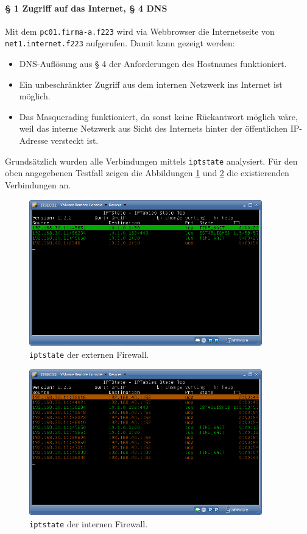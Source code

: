 \paragraph{§ 1 Zugriff auf das Internet, § 4 DNS}

Mit dem {\tt pc01.firma-a.f223} wird via Webbrowser die Internetseite
von {\tt net1.internet.f223} aufgerufen.
Damit kann gezeigt werden:
\begin{itemize}
  \item DNS-Auflösung aus § 4 der Anforderungen des Hostnames funktioniert.
  \item Ein unbeschränkter Zugriff aus dem internen Netzwerk ins Internet
        ist möglich.
  \item Das Masquerading funktioniert, da sonst keine Rückantwort möglich wäre,
        weil das interne Netzwerk aus Sicht des Internets hinter der
        öffentlichen IP-Adresse versteckt ist.
\end{itemize}

\noindent Grundsätzlich wurden alle Verbindungen mittels {\tt iptstate} analysiert.
Für den oben angegebenen Testfall zeigen die Abbildungen
\ref{fig.iptstate-extern} und \ref{fig.iptstate-intern} die existierenden
Verbindungen an.

\begin{figure}[h!]
  \centering
    \includegraphics[width=0.9\textwidth]{figures/iptstate-extern.png}
  \caption{{\tt iptstate} der externen Firewall.}
  \label{fig.iptstate-extern}
\end{figure}

\begin{figure}[h!]
  \centering
    \includegraphics[width=0.9\textwidth]{figures/iptstate-intern.png}
  \caption{{\tt iptstate} der internen Firewall.}
  \label{fig.iptstate-intern}
\end{figure}


